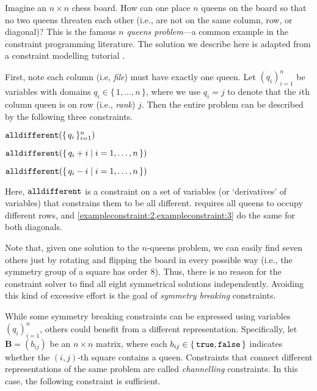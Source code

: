 \begin{example}[$n$ queens]
  Imagine an $n \times n$ chess board. How can one place $n$ queens on the board
  so that no two queens threaten each other (i.e., are not on the same column,
  row, or diagonal)? This is the famous \emph{$n$ queens problem}---a common
  example in the constraint programming literature. The solution we describe
  here is adapted from a constraint modelling tutorial \citep{minizinc}.

  First, note each column (i.e, \emph{file}) must have exactly one queen. Let
  $(q_i)_{i=1}^n$ be variables with domains $q_i \in \{\, 1, \dots, n \,\}$,
  where we use $q_i = j$ to denote that the $i$th column queen is on row (i.e.,
  \emph{rank}) $j$. Then the entire problem can be described by the following
  three constraints.

  \begin{constraint}\label{exampleconstraint:1}
    $\operatorname{\mathtt{alldifferent}}(\{\,q_i\,\}_{i=1}^n)$
  \end{constraint}

  \begin{constraint}\label{exampleconstraint:2}
    $\operatorname{\mathtt{alldifferent}}(\{\, q_i + i \mid i = 1, \dots, n \,\})$
  \end{constraint}

  \begin{constraint}\label{exampleconstraint:3}
    $\operatorname{\mathtt{alldifferent}}(\{\, q_i - i \mid i = 1, \dots, n \,\})$
  \end{constraint}

  Here, $\operatorname{\mathtt{alldifferent}}$ is a constraint on a set of variables (or `derivatives'
  of variables) that constrains them to be all different.
   requires all queens to occupy different rows, and
  \cref{exampleconstraint:2,exampleconstraint:3} do the same for both diagonals.

  Note that, given one solution to the $n$-queens problem, we can easily find
  seven others just by rotating and flipping the board in every possible way
  (i.e., the symmetry group of a square has order 8). Thus, there is no reason
  for the constraint solver to find all eight symmetrical solutions
  independently. Avoiding this kind of excessive effort is the goal of
  \emph{symmetry breaking} constraints.

  While some symmetry breaking constraints can be expressed using variables
  ${(q_i)}_{i=1}^n$, others could benefit from a different representation.
  Specifically, let $\mathbf{B} = (b_{ij})$ be an $n \times n$ matrix, where
  each $b_{ij} \in \{\, \texttt{true}{}, \texttt{false}{} \,\}$ indicates whether the $(i,j)$-th
  square contains a queen. Constraints that connect different representations of
  the same problem are called \emph{channelling} constraints. In this case, the
  following constraint is sufficient.


\end{example}
